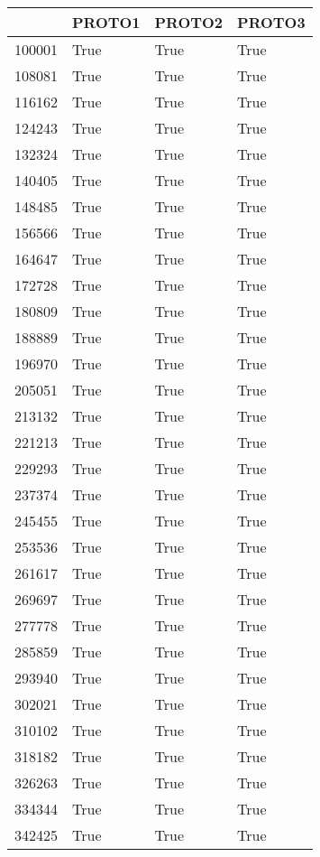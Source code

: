 \begin{tabular}{llll}
\toprule
{} &  PROTO1 &  PROTO2 &  PROTO3 \\
\midrule
100001 &    True &    True &    True \\
108081 &    True &    True &    True \\
116162 &    True &    True &    True \\
124243 &    True &    True &    True \\
132324 &    True &    True &    True \\
140405 &    True &    True &    True \\
148485 &    True &    True &    True \\
156566 &    True &    True &    True \\
164647 &    True &    True &    True \\
172728 &    True &    True &    True \\
180809 &    True &    True &    True \\
188889 &    True &    True &    True \\
196970 &    True &    True &    True \\
205051 &    True &    True &    True \\
213132 &    True &    True &    True \\
221213 &    True &    True &    True \\
229293 &    True &    True &    True \\
237374 &    True &    True &    True \\
245455 &    True &    True &    True \\
253536 &    True &    True &    True \\
261617 &    True &    True &    True \\
269697 &    True &    True &    True \\
277778 &    True &    True &    True \\
285859 &    True &    True &    True \\
293940 &    True &    True &    True \\
302021 &    True &    True &    True \\
310102 &    True &    True &    True \\
318182 &    True &    True &    True \\
326263 &    True &    True &    True \\
334344 &    True &    True &    True \\
342425 &    True &    True &    True \\

\end{tabular}
